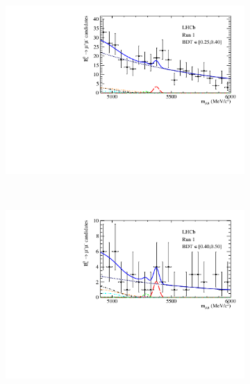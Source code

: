 {{%


\begin{figure}[htbp]
    \centering
    \begin{subfigure}[b]{0.48\textwidth}
        \includegraphics[width=\textwidth]{./Figs/BFAnalysis/Bsmumu_Fit_Run1_bin2.pdf}
    \end{subfigure}
    ~ %
    \begin{subfigure}[b]{0.48\textwidth}
       \includegraphics[width=\textwidth]{./Figs/BFAnalysis/Bsmumu_Fit_Run1_bin3.pdf}

\end{subfigure}
\end{figure}}}
